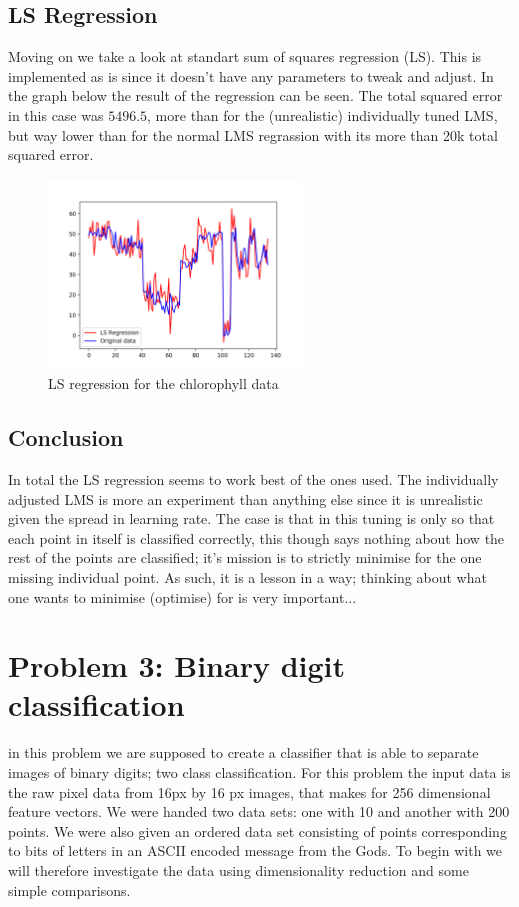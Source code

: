 \documentclass[12pt, a4paper]{article}
\begin{document}
\subsection{LS Regression}
Moving on we take a look at standart sum of squares regression (LS). This is implemented as is since it doesn't have any parameters to tweak and adjust. In the graph below the result of the regression can be seen. The total squared error in this case was $5496.5$, more than for the (unrealistic) individually tuned LMS, but way lower than for the normal LMS regrassion with its more than 20k total squared error.

\begin{figure}[H]
    \centering
    \includegraphics[width=0.6\textwidth]{recursos/2/ls_regression}
    \caption{ LS regression for the chlorophyll data }
\end{figure}

\subsection{Conclusion}
In total the LS regression seems to work best of the ones used. The individually adjusted LMS is more an experiment than anything else since it is unrealistic given the spread in learning rate. The case is that in this tuning is only so that each point in itself is classified correctly, this though says nothing about how the rest of the points are classified; it's mission is to strictly minimise for the one missing individual point.  As such, it is a lesson in a way; thinking about what one wants to minimise (optimise) for is very important...



\section{Problem 3: Binary digit classification}
in this problem we are supposed to create a classifier that is able to separate images of binary digits; two class classification. For this problem the input data is the raw pixel data from 16px by 16 px images, that makes for 256 dimensional feature vectors. We were handed two data sets: one with 10 and another with 200 points. We were also given an ordered data set consisting of points corresponding to bits of letters in an ASCII encoded message from the Gods. To begin with we will therefore investigate the data using dimensionality reduction and some simple comparisons. 
\end{document}
